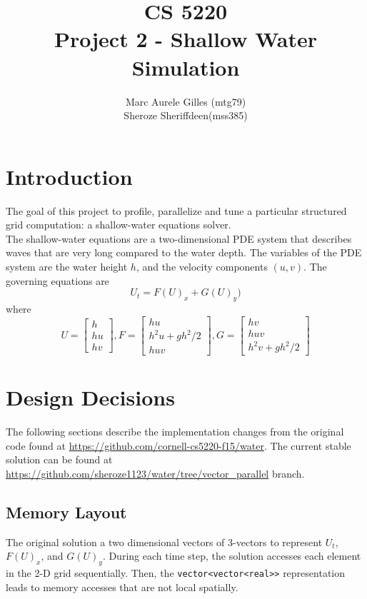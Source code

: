 \documentclass[11pt]{article}
\begin{document}
\title{CS 5220\\ Project 2 - Shallow Water Simulation}
\author{Marc Aurele Gilles (mtg79)\\ Sheroze Sheriffdeen(mss385)}
\maketitle

\section{Introduction}

The goal of this project to profile, parallelize and tune a particular structured grid computation: a shallow-water equations solver.  \\

The shallow-water equations are a two-dimensional PDE system that describes waves that are very long compared to the water depth. The variables of the PDE system are the water height $h$, and the velocity components $(u,v)$. The governing equations are \\

$$U_t = F(U)_x + G(U)_y)$$
where 
$$U = \begin{bmatrix}
h \\
hu \\
hv
\end{bmatrix}
,
F = \begin{bmatrix}
hu \\
h^2u+gh^2/2 \\
huv
\end{bmatrix}
,
G=
\begin{bmatrix}
hv \\
huv \\
h^2v+gh^2/2
\end{bmatrix}
$$


\section{Design Decisions}

The following sections describe the implementation changes from the original code found at \url{https://github.com/cornell-cs5220-f15/water}. The current stable solution can be found at \url{https://github.com/sheroze1123/water/tree/vector_parallel} branch. 

\subsection{Memory Layout}
The original solution a two dimensional vectors of 3-vectors to represent $U_t$, $F(U)_x$, and $G(U)_y$. During each time step, the solution accesses each element in the 2-D grid sequentially. Then, the \texttt{vector<vector<real>>} representation leads to memory accesses that are not local spatially. \\
\end{document}

